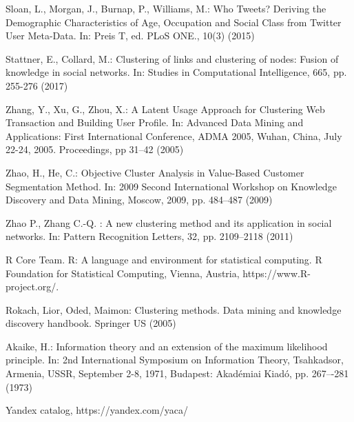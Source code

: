 \documentclass[runningheads,a4paper]{llncs}
\begin{document}
\begin{thebibliography}{4}


Sloan, L., Morgan, J., Burnap, P., Williams, M.: Who Tweets? Deriving the Demographic Characteristics of Age, Occupation and Social Class from Twitter User Meta-Data. In: Preis T, ed. PLoS ONE., 10(3) (2015)

Stattner, E., Collard, M.: Clustering of links and clustering of nodes: Fusion of knowledge in social networks. In: Studies in Computational Intelligence, 665, pp. 255-276 (2017)

Zhang, Y., Xu, G., Zhou, X.: A Latent Usage Approach for Clustering Web Transaction and Building User Profile. In: Advanced Data Mining and Applications: First International Conference, ADMA 2005, Wuhan, China, July 22-24, 2005. Proceedings, pp 31--42 (2005)

Zhao, H., He, C.: Objective Cluster Analysis in Value-Based Customer Segmentation Method. In: 2009 Second International Workshop on Knowledge Discovery and Data Mining, Moscow, 2009, pp. 484--487 (2009)

Zhao P., Zhang C.-Q. : A new clustering method and its application in social networks. In: Pattern Recognition Letters, 32, pp. 2109--2118 (2011)

 R Core Team. R: A language and environment for statistical computing. R Foundation for Statistical Computing, Vienna, Austria, https://www.R-project.org/.

 Rokach, Lior, Oded, Maimon: Clustering methods. Data mining and knowledge discovery handbook. Springer US (2005)

 Akaike, H.: Information theory and an extension of the maximum likelihood principle. In: 2nd International Symposium on Information Theory, Tsahkadsor, Armenia, USSR, September 2-8, 1971, Budapest: Akadémiai Kiadó, pp. 267–-281 (1973)

 Yandex catalog, https://yandex.com/yaca/



\end{thebibliography}
\end{document}
